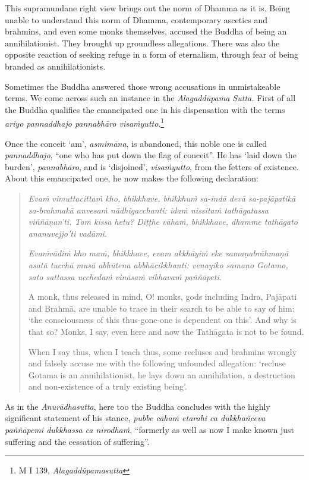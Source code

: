 This supramundane right view brings out the norm of Dhamma as it is. Being unable to understand this norm of Dhamma, contemporary ascetics and brahmins, and even some monks themselves, accused the Buddha of being an annihilationist. They brought up groundless allegations. There was also the opposite reaction of seeking refuge in a form of eternalism, through fear of being branded as annihilationists.

Sometimes the Buddha answered those wrong accusations in unmistakeable terms. We come across such an instance in the \emph{Alagaddūpama Sutta.} First of all the Buddha qualifies the emancipated one in his dispensation with the terms \emph{ariyo pannaddhajo pannabhāro visaṁyutto}.\footnote{M I 139, \emph{Alagaddūpamasutta}}

Once the conceit `am', \emph{asmimāna}, is abandoned, this noble one is called \emph{pannaddhajo}, ``one who has put down the flag of conceit''. He has `laid down the burden', \emph{pannabhāro}, and is `disjoined', \emph{visaṁyutto}, from the fetters of existence. About this emancipated one, he now makes the following declaration:

\begin{quote}
\emph{Evaṁ vimuttacittaṁ kho, bhikkhave, bhikkhuṁ sa-indā devā sa-pajāpatikā sa-brahmakā anvesaṁ nādhigacchanti: idaṁ nissitaṁ tathāgatassa viññāṇan'ti. Taṁ kissa hetu? Diṭṭhe vāhaṁ, bhikkhave, dhamme tathāgato ananuvejjo'ti vadāmi}.

\emph{Evaṁvādiṁ kho maṁ, bhikkhave, evam akkhāyiṁ eke samaṇabrāhmaṇā asatā tucchā musā abhūtena abbhācikkhanti: venayiko samaṇo Gotamo, sato sattassa ucchedaṁ vināsaṁ vibhavaṁ paññāpeti}.

A monk, thus released in mind, O! monks, gods including Indra, Pajāpati and Brahmā, are unable to trace in their search to be able to say of him: `the consciousness of this thus-gone-one is dependent on this'. And why is that so? Monks, I say, even here and now the Tathāgata is not to be found.

When I say thus, when I teach thus, some recluses and brahmins wrongly and falsely accuse me with the following unfounded allegation: `recluse Gotama is an annihilationist, he lays down an annihilation, a destruction and non-existence of a truly existing being'.
\end{quote}

As in the \emph{Anurādhasutta}, here too the Buddha concludes with the highly significant statement of his stance, \emph{pubbe cāhaṁ etarahi ca dukkhañceva paññāpemi dukkhassa ca nirodhaṁ}, ``formerly as well as now I make known just suffering and the cessation of suffering''.

